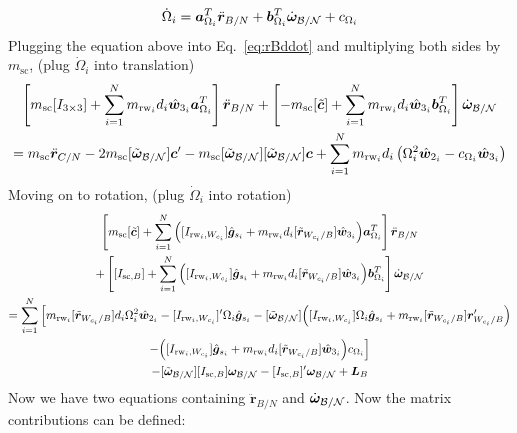 \begin{equation}
\dot{\Omega}_i = \bm{a}_{\Omega_i}^T\ddot{\bm r}_{B/N} + \bm{b}_{\Omega_i}^T\dot{\bm\omega}_{\cal B/N} + c_{\Omega_i}
\end{equation}
Plugging the equation above into Eq.~\eqref{eq:rBddot} and multiplying both sides by $m_\text{sc}$, (plug $\dot{\Omega}_i$ into translation)
\begin{multline}
\left[m_\text{sc} [I_{3\times3}] +\sum\limits_{i=1}^{N}m_{\text{rw}_i}d_i\hat{\bm{w}}_{3_i}\bm{a}_{\Omega_i}^T \right] \ddot{\bm r}_{B/N} +\left[ -m_\text{sc} [\tilde{\bm{c}}] + \sum\limits_{i=1}^{N}m_{\text{rw}_i}d_i\hat{\bm{w}}_{3_i}\bm{b}_{\Omega_i}^T \right] \dot{\bm\omega}_{\cal B/N} 
\\= m_\text{sc} \ddot{\bm r}_{C/N}   - 2 m_\text{sc} [\tilde{\bm\omega}_{\cal B/N}]\bm{c}'-m_\text{sc} [\tilde{\bm\omega}_{\cal B/N}][\tilde{\bm\omega}_{\cal B/N}]\bm{c} + \sum\limits_{i=1}^{N}m_{\text{rw}_i}d_i\left(\Omega_i^2\hat{\bm{w}}_{2_i}-c_{\Omega_i}\hat{\bm{w}}_{3_i}\right)
\end{multline}
Moving on to rotation, (plug $\dot{\Omega}_i$ into rotation)
\begin{multline}
\left[ m_{\text{sc}}[\tilde{\bm c}]+ \sum\limits_{i=1}^{N}\Big([I_{\text{rw}_i,W_{c_i}}]\hat{\bm{g}}_{s_i} + m_{\text{rw}_i}d_i[\tilde{\bm{r}}_{W_{c_i}/B}]\hat{\bm{w}}_{3_i}\Big)\bm{a}_{\Omega_i}^T \right] \ddot{\bm r}_{B/N}
\\ 
+ \left[ [I_{\text{sc},B}] + \sum\limits_{i=1}^{N}\Big([I_{\text{rw}_i,W_{c_i}}]\hat{\bm{g}}_{s_i} + m_{\text{rw}_i}d_i[\tilde{\bm{r}}_{W_{c_i}/B}]\hat{\bm{w}}_{3_i}\Big)\bm{b}_{\Omega_i}^T \right] \dot{\bm\omega}_{\cal B/N} 
\\= 
\sum\limits_{i=1}^{N}\Big[ m_{\text{rw}_i}[\tilde{\bm{r}}_{W_{c_i}/B}]d_i \Omega_i^2\hat{\bm{w}}_{2_i}-[I_{\text{rw}_i,W_{c_i}}]'\Omega_i \hat{\bm{g}}_{s_i} -[\tilde{\bm\omega}_{\cal B/N}]\Big([I_{\text{rw}_i,W_{c_i}}]\Omega_i \hat{\bm{g}}_{s_i}+ m_{\text{rw}_i}[\tilde{\bm{r}}_{W_{c_i}/B}]\bm{r}'_{W_{c_i}/B}\Big) \\ 
-\Big([I_{\text{rw}_i,W_{c_i}}]\hat{\bm{g}}_{s_i} + m_{\text{rw}_i}d_i[\tilde{\bm{r}}_{W_{c_i}/B}]\hat{\bm{w}}_{3_i}\Big)c_{\Omega_i}\Big]
\\  -[\tilde{\bm\omega}_{\cal B/N}][I_{\text{sc},B}]\bm\omega_{\cal B/N}-  [I_{\text{sc},B}]'\bm\omega_{\cal B/N} + \bm{L}_B
\end{multline}
Now we have two equations containing $\ddot{\bm{r}}_{B/N}$ and $\dot{\bm\omega}_{\cal B/N}$. Now the matrix contributions can be defined:

